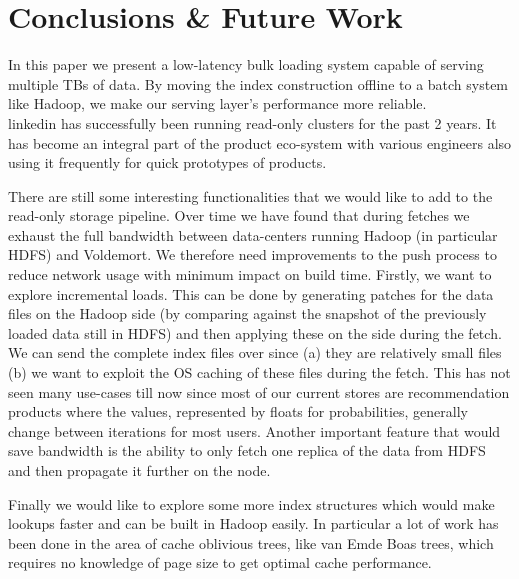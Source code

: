 \section{Conclusions \& Future Work}
\label{sec:conclusion}

In this paper we present a low-latency bulk loading system capable of serving multiple TBs of data. By moving the index construction offline to a batch system like Hadoop, we make our serving layer's performance more reliable. \\linkedin{} has successfully been running read-only \projectname{} clusters for the past 2 years. It has become an integral part of the product eco-system with various engineers also using it frequently for quick prototypes of products. 

There are still some interesting functionalities that we would like to add to the read-only storage pipeline. Over time we have found that during fetches we exhaust the full bandwidth between data-centers running Hadoop (in particular HDFS) and Voldemort. We therefore need improvements to the push process to reduce network usage with minimum impact on build time. Firstly, we want to explore incremental loads. This can be done by generating patches for the data files on the Hadoop side (by comparing against the snapshot of the previously loaded data still in HDFS) and then applying these on the \projectname{} side during the fetch. We can send the complete index files over since (a) they are relatively small files (b) we want to exploit the OS caching of these files during the fetch. This has not seen many use-cases till now since most of our current stores are recommendation products where the values, represented by floats for probabilities, generally change between iterations for most users. Another important feature that would save bandwidth is the ability to only fetch one replica of the data from HDFS and then propagate it further on the \projectname{} node. 

Finally we would like to explore some more index structures which would make lookups faster and can be built in Hadoop easily. In particular a lot of work has been done in the area of cache oblivious trees, like van Emde Boas trees, which requires no knowledge of page size to get optimal cache performance. 
